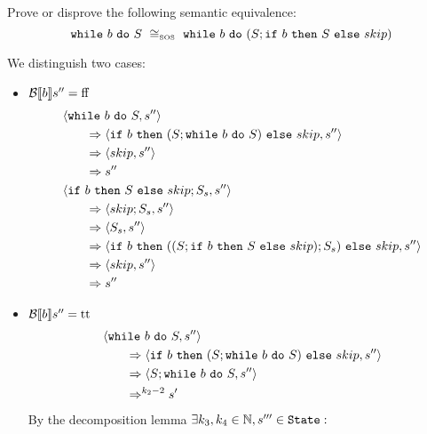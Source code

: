 \begin{exercise}{
    Prove or disprove the following semantic equivalence:
    \[ \wwhile{b}{S}\ \SOScong\ \wwhile{b}{(S;\wif{b}{S}{skip})} \]
}
\begin{itemize}
\begin{itemize}
\begin{itemize}
\[                            \]
                            We distinguish two cases:
                            \begin{itemize}
                                \item $\mathcal{B} \llbracket b \rrbracket s'' = \text{ff}$
                                    \begin{align*}
                                        &\left<\texttt{while}\ b\ \texttt{do}\ S, s''\right>
                                        \\&\qquad\Rightarrow \left<\texttt{if}\ b\ \texttt{then}\ (S; \texttt{while}\ b\ \texttt{do}\ S)\ \texttt{else}\ skip, s''\right>
                                        \\&\qquad\Rightarrow \left<skip, s''\right>
                                        \\&\qquad\Rightarrow s''
                                        \\
                                        &\left<\texttt{if}\ b\ \texttt{then}\ S\ \texttt{else}\ skip;S_s, s''\right>
                                        \\&\qquad\Rightarrow \left<skip;S_s, s''\right>
                                        \\&\qquad\Rightarrow \left<S_s, s''\right>
                                        \\&\qquad\Rightarrow \left<\texttt{if}\ b\ \texttt{then}\ ((S;\texttt{if}\ b\ \texttt{then}\ S\ \texttt{else}\ skip);S_s)\ \texttt{else}\ skip, s''\right>
                                        \\&\qquad\Rightarrow \left<skip, s''\right>
                                        \\&\qquad\Rightarrow s''
                                    \end{align*}
                                \item $\mathcal{B} \llbracket b \rrbracket s'' = \text{tt}$
                                    \begin{align*}
                                        &\left<\texttt{while}\ b\ \texttt{do}\ S, s''\right>
                                        \\&\qquad\Rightarrow \left<\texttt{if}\ b\ \texttt{then}\ (S; \texttt{while}\ b\ \texttt{do}\ S)\ \texttt{else}\ skip, s''\right>
                                        \\&\qquad\Rightarrow \left<S; \texttt{while}\ b\ \texttt{do}\ S, s''\right>
                                        \\&\qquad\Rightarrow^{k_2 - 2} s'
                                    \end{align*}
                                    By the decomposition lemma $\exists k_3, k_4 \in \mathbb{N}, s''' \in \texttt{State} :$
                                    \begin{gather*}

\end{gather*}
\end{itemize}
\end{itemize}
\end{itemize}
\end{itemize}
\end{exercise}
